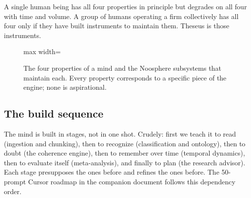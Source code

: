 \documentclass[11pt]{article}
\begin{document}
A single human being has all four properties in principle but degrades on all four with time and volume. A group of humans operating a firm collectively has all four only if they have built instruments to maintain them. Theseus is those instruments.

\begin{figure}[H]
\centering
\begin{adjustbox}{max width=\textwidth}
\end{adjustbox}
\caption{The four properties of a mind and the Noosphere subsystems that maintain each. Every property corresponds to a specific piece of the engine; none is aspirational.}
\end{figure}

\subsection{The build sequence}

The mind is built in stages, not in one shot. Crudely: first we teach it to read (ingestion and chunking), then to recognize (classification and ontology), then to doubt (the coherence engine), then to remember over time (temporal dynamics), then to evaluate itself (meta-analysis), and finally to plan (the research advisor). Each stage presupposes the ones before and refines the ones before. The 50-prompt Cursor roadmap in the companion document follows this dependency order.
\end{document}
